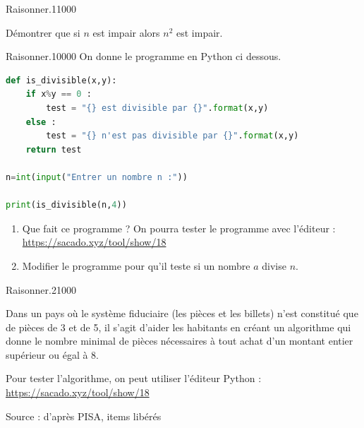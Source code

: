 %
\begin{pageParcourst}



 
\begin{ExoCtN}{Raisonner.}{1}{1}{0}{0}{0}

  Démontrer que si $n$ est impair alors $n^2$ est impair.

 
\end{ExoCtN}


\begin{ExoCtN}{Raisonner.}{1}{0}{0}{0}{0}
On donne le programme en Python ci dessous. 
 
\begin{lstlisting}[language=Python] 
def is_divisible(x,y):
    if x%y == 0 :
    	test = "{} est divisible par {}".format(x,y) 
    else :	
        test = "{} n'est pas divisible par {}".format(x,y)
    return test    
    
n=int(input("Entrer un nombre n :"))
    
print(is_divisible(n,4))
\end{lstlisting}
 
\begin{enumerate}
\item Que fait ce programme ? On pourra tester le programme avec l'éditeur : \url{https://sacado.xyz/tool/show/18}  
\item Modifier le programme pour qu'il teste si un nombre $a$ divise $n$.   
\end{enumerate}
 
\end{ExoCtN}



\begin{ExoCtN}{Raisonner.}{2}{1}{0}{0}{0}
 
 
Dans un pays où le système fiduciaire (les pièces et les billets) n'est constitué que de pièces de 3 et de 5, il s'agit d'aider les habitants en créant un algorithme  qui donne le nombre minimal de pièces nécessaires à tout achat d'un montant entier supérieur ou égal à 8. 

Pour tester l'algorithme, on peut utiliser l'éditeur Python : \url{https://sacado.xyz/tool/show/18}

\hfill{{\footnotesize Source : d’après PISA, items libérés}}
 

\end{ExoCtN}
\end{pageParcourst}
